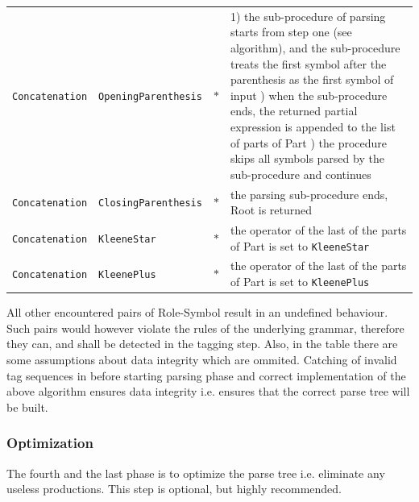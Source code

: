 \documentclass{article}
\begin{document}
\begin{tabularx}{\textwidth}{l|l|l|X}
\verb|Concatenation| & \verb|OpeningParenthesis| & $*$ &

1) the sub-procedure of parsing starts from step one (see algorithm), and the sub-procedure treats the first
symbol after the parenthesis as the first symbol of input \newline
2) when the sub-procedure ends, the returned partial expression is appended to the list of parts of Part \newline
3) the procedure skips all symbols parsed by the sub-procedure and continues \\

\verb|Concatenation| & \verb|ClosingParenthesis| & $*$ &

the parsing sub-procedure ends, Root is returned \\

\verb|Concatenation| & \verb|KleeneStar| & $*$ &

the operator of the last of the parts of Part is set to \verb|KleeneStar| \\

\verb|Concatenation| & \verb|KleenePlus| & $*$ &

the operator of the last of the parts of Part is set to \verb|KleenePlus| \\

\end{tabularx}

\vspace{10pt} All other encountered pairs of Role-Symbol result in an undefined behaviour. Such pairs would
however violate the rules of the underlying grammar, therefore they can, and shall be detected in
the tagging step. Also, in the table there are some assumptions about data integrity which are
ommited. Catching of invalid tag sequences in before starting parsing phase and correct
implementation of the above algorithm ensures data integrity i.e. ensures that the correct parse
tree will be built.

\subsubsection{Optimization}
The fourth and the last phase is to optimize the parse tree i.e. eliminate any useless productions.
This step is optional, but highly recommended.
\end{document}

